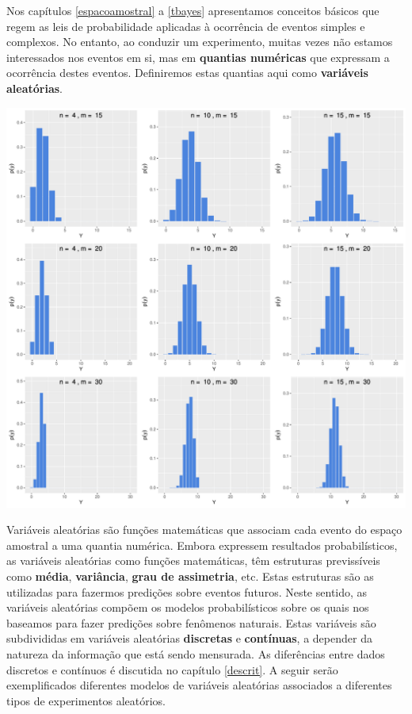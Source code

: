 \documentclass[
]{book}
\begin{document}
Nos capítulos \ref{espacoamostral} a \ref{tbayes} apresentamos conceitos básicos que regem as leis de probabilidade aplicadas à ocorrência de eventos simples e complexos. No entanto, ao conduzir um experimento, muitas vezes não estamos interessados nos eventos em si, mas em \textbf{quantias numéricas} que expressam a ocorrência destes eventos. Definiremos estas quantias aqui como \textbf{variáveis aleatórias}.

\begin{center}\includegraphics{probest-cambientais_files/figure-latex/unnamed-chunk-201-1} \end{center}

Variáveis aleatórias são funções matemáticas que associam cada evento do espaço amostral a uma quantia numérica. Embora expressem resultados probabilísticos, as variáveis aleatórias como funções matemáticas, têm estruturas previssíveis como \textbf{média}, \textbf{variância}, \textbf{grau de assimetria}, etc. Estas estruturas são as utilizadas para fazermos predições sobre eventos futuros. Neste sentido, as variáveis aleatórias compõem os modelos probabilísticos sobre os quais nos baseamos para fazer predições sobre fenômenos naturais. Estas variáveis são subdivididas em variáveis aleatórias \textbf{discretas} e \textbf{contínuas}, a depender da natureza da informação que está sendo mensurada. As diferências entre dados discretos e contínuos é discutida no capítulo \ref{descrit}. A seguir serão exemplificados diferentes modelos de variáveis aleatórias associados a diferentes tipos de experimentos aleatórios.
\end{document}
